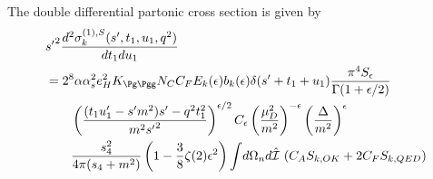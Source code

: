 The double differential partonic cross section is given by
\begin{align}
&{s'}^2\frac{d^2\sigma_{k}^{(1),S}(s',t_1,u_1,q^2)}{dt_1du_1} \nonumber\\
 &= 2^8\alpha\alpha_s^2 e_H^2 K_{\Pg\Pgg}N_CC_F E_k(\epsilon) b_k(\epsilon)\delta(s'+t_1+u_1)\frac{\pi^4 S_\epsilon}{\Gamma(1+\epsilon/2)} \nonumber\\
 &\hspace{20pt} \left(\frac{(t_1u_1'-s'm^2)s' - q^2t_1^2}{m^2{s'}^2}\right)^{\epsilon/2} C_\epsilon \left(\frac{\mu_D^2}{m^2}\right)^{-\epsilon} \left(\frac \Delta {m^2}\right)^\epsilon \nonumber\\
 &\hspace{20pt}\frac{s_4^2}{4\pi(s_4+m^2)}\left(1-\frac 3 8 \zeta(2)\epsilon^2\right)\int\!d\Omega_n d\hat{\mathcal I}\,\left(C_A S_{k,OK} + 2C_F S_{k,QED}\right)
\end{align}
